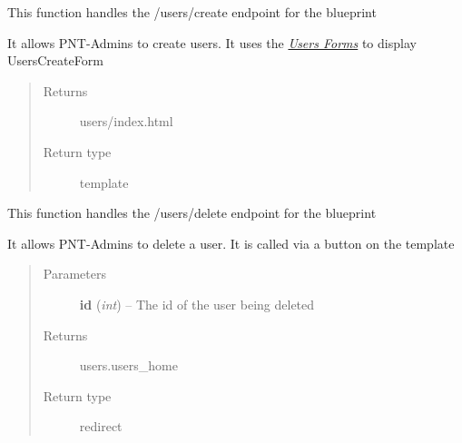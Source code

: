 \documentclass[letterpaper,10pt,english]{sphinxmanual}
\begin{document}

\begin{fulllineitems}
\label{dev-users:cagenix.users.views.users_create}
This function handles the /users/create endpoint for the blueprint

It allows PNT-Admins to create users.  It uses the {\hyperref[dev-users:users-forms-label]{\emph{Users Forms}}}
to display UsersCreateForm
\begin{quote}\begin{description}
\item[{Returns}] \leavevmode
users/index.html

\item[{Return type}] \leavevmode
template

\end{description}\end{quote}

\end{fulllineitems}


\begin{fulllineitems}
\label{dev-users:cagenix.users.views.users_delete}
This function handles the /users/delete endpoint for the blueprint

It allows PNT-Admins to delete a user.  It is called via a button on
the  template
\begin{quote}\begin{description}
\item[{Parameters}] \leavevmode
\textbf{id} (\emph{int}) -- The id of the user being deleted

\item[{Returns}] \leavevmode
users.users\_home

\item[{Return type}] \leavevmode
redirect

\end{description}\end{quote}

\end{fulllineitems}

\end{document}
